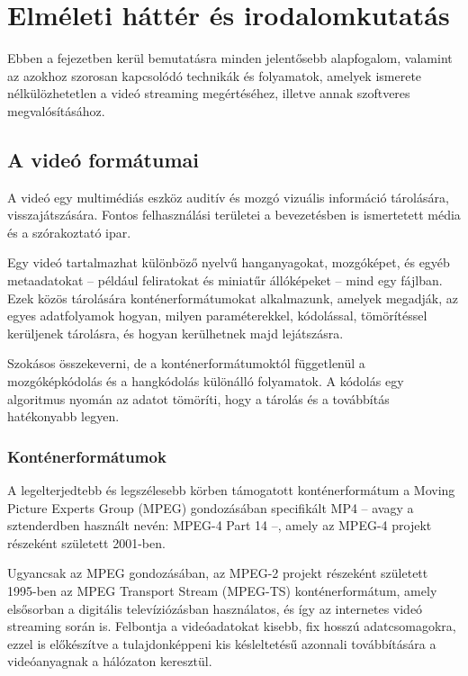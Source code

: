 \chapter{Elméleti háttér és irodalomkutatás}

Ebben a fejezetben kerül bemutatásra minden jelentősebb alapfogalom,  valamint az azokhoz szorosan kapcsolódó technikák és folyamatok, amelyek ismerete nélkülözhetetlen a videó streaming megértéséhez, illetve annak szoftveres megvalósításához.

\section{A videó formátumai}

A videó egy multimédiás eszköz auditív és mozgó vizuális információ tárolására, visszajátszására. Fontos felhasználási területei a bevezetésben is ismertetett média és a szórakoztató ipar.

Egy videó tartalmazhat különböző nyelvű hanganyagokat, mozgóképet, és egyéb metaadatokat -- például feliratokat és miniatűr állóképeket -- mind egy fájlban. Ezek közös tárolására konténerformátumokat alkalmazunk, amelyek megadják, az egyes adatfolyamok hogyan, milyen paraméterekkel, kódolással, tömörítéssel kerüljenek tárolásra, és hogyan kerülhetnek majd lejátszásra.

Szokásos összekeverni, de a konténerformátumoktól függetlenül a mozgóképkódolás és a hangkódolás különálló folyamatok. A kódolás egy algoritmus nyomán az adatot tömöríti, hogy a tárolás és a továbbítás hatékonyabb legyen.

\subsection{Konténerformátumok}

A legelterjedtebb és legszélesebb körben támogatott konténerformátum a Moving Picture Experts Group (MPEG) gondozásában specifikált MP4 -- avagy a sztenderdben használt nevén: MPEG-4 Part 14 --, amely az MPEG-4 projekt részeként született 2001-ben.

Ugyancsak az MPEG gondozásában, az MPEG-2 projekt részeként született 1995-ben az MPEG Transport Stream (MPEG-TS) konténerformátum, amely elsősorban a digitális televíziózásban használatos, és így az internetes videó streaming során is. Felbontja a videóadatokat kisebb, fix hosszú adatcsomagokra, ezzel is előkészítve a tulajdonképpeni kis késleltetésű azonnali továbbítására a videóanyagnak a hálózaton keresztül.

